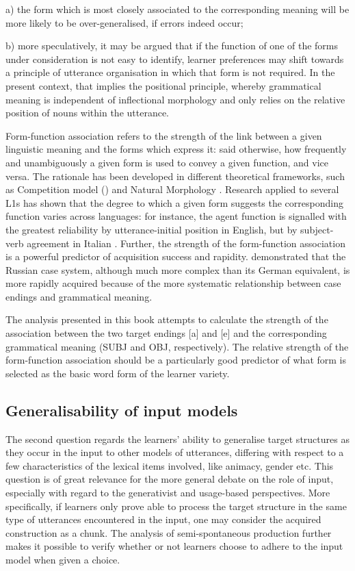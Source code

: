a) the form which is most closely associated to the corresponding meaning will be more likely to be over-generalised, if errors indeed occur;

b) more speculatively, it may be argued that if the function of one of the forms under consideration is not easy to identify, learner preferences may shift towards a principle of utterance organisation in which that form is not required. In the present context, that implies the positional principle, whereby grammatical meaning is independent of inflectional morphology and only relies on the relative position of nouns within the utterance. 

Form-function association refers to the strength of the link between a given linguistic meaning and the forms which express it: said otherwise, how frequently and unambiguously a given form is used to convey a given function, and vice versa. The rationale has been developed in different theoretical frameworks, such as Competition model (\citealt{MacWhinneyBates1987}) and Natural Morphology \citep{Dressler1987}. Research applied to several L1s has shown that the degree to which a given form suggests the corresponding function varies across languages: for instance, the agent function is signalled with the greatest reliability by utterance-initial position in English, but by subject-verb agreement in Italian \citep{MacWhinneyEtAl1984}. Further, the strength of the form-function association is a powerful predictor of acquisition success and rapidity. \citet{KempeMacWhinney1998} demonstrated that the Russian case system, although much more complex than its German equivalent, is more rapidly acquired because of the more systematic relationship between case endings and grammatical meaning. 

The analysis presented in this book attempts to calculate the strength of the association between the two target endings [a] and [e] and the corresponding grammatical meaning (SUBJ and OBJ, respectively). The relative strength of the form-function association should be a particularly good predictor of what form is selected as the basic word form of the learner variety.

\subsection{Generalisability of input models}\label{sec:01:4.2}

The second question regards the learners’ ability to generalise target structures as they occur in the input to other models of utterances, differing with respect to a few characteristics of the lexical items involved, like animacy, gender etc. This question is of great relevance for the more general debate on the role of input, especially with regard to the generativist and usage-based perspectives. More specifically, if learners only prove able to process the target structure in the same type of utterances encountered in the input, one may consider the acquired construction as a chunk. The analysis of semi-spontaneous production further makes it possible to verify whether or not learners choose to adhere to the input model when given a choice.

